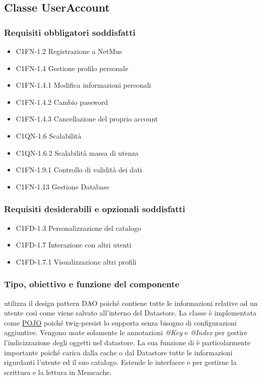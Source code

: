 \subsection{Classe UserAccount}
\subsubsection*{Requisiti obbligatori soddisfatti}
\begin{itemize}
    \item C1FN-1.2 Registrazione a NetMus
    \item C1FN-1.4 Gestione profilo personale
    \item C1FN-1.4.1 Modifica informazioni personali
    \item C1FN-1.4.2 Cambio password
    \item C1FN-1.4.3 Cancellazione del proprio account
    \item C1QN-1.6 Scalabilit\`a
    \item C1QN-1.6.2 Scalabilit\`a massa di utenza
    \item C1FN-1.9.1 Controllo di validit\`a dei dati
    \item C1FN-1.13 Gestione Database
\end{itemize}
\subsubsection*{Requisiti desiderabili e opzionali soddisfatti}
\begin{itemize}
    \item C1FD-1.3 Personalizzazione del catalogo
    \item C1FD-1.7 Interazione con altri utenti
    \item C1FD-1.7.1 Visualizzazione altri profili
\end{itemize}
\subsubsection*{Tipo, obiettivo e funzione del componente}
 utilizza il design pattern DAO poich\'e contiene tutte le
informazioni relative ad un utente cos\`i come viene salvato all'interno del
Datastore. La classe \`e implementata come \underline{POJO} poich\'e
twig-persist lo supporta senza bisogno di configurazioni aggiuntive. Vengono usate solamente
le annotazioni \emph{@Key} e \emph{@Index} per gestire l'indicizzazione
degli oggetti nel datastore. La sua funzione di  \`e particolarmente
importante poich\'e carica dalla cache o dal Datastore tutte le informazioni
rigurdanti l'utente ed il suo catalogo. Estende le interfacce 
e  per gestirne la scrittura e la
lettura in Memcache.
